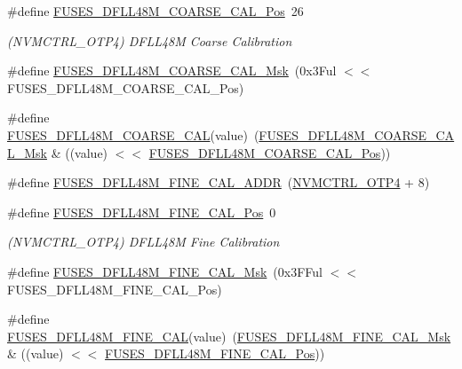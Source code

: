 \begin{DoxyCompactItemize}
\item 
\#define \mbox{\hyperlink{group__fuses__api_gae354249a65d7b4d818bbcc3594aa4991}{F\+U\+S\+E\+S\+\_\+\+D\+F\+L\+L48\+M\+\_\+\+C\+O\+A\+R\+S\+E\+\_\+\+C\+A\+L\+\_\+\+Pos}}~26
\begin{DoxyCompactList}\small\item\em (N\+V\+M\+C\+T\+R\+L\+\_\+\+O\+T\+P4) D\+F\+L\+L48M Coarse Calibration \end{DoxyCompactList}\item 
\#define \mbox{\hyperlink{group__fuses__api_ga0dc28e80d782bf23e5b6ad8d7fb5670e}{F\+U\+S\+E\+S\+\_\+\+D\+F\+L\+L48\+M\+\_\+\+C\+O\+A\+R\+S\+E\+\_\+\+C\+A\+L\+\_\+\+Msk}}~(0x3\+Ful $<$$<$ F\+U\+S\+E\+S\+\_\+\+D\+F\+L\+L48\+M\+\_\+\+C\+O\+A\+R\+S\+E\+\_\+\+C\+A\+L\+\_\+\+Pos)
\item 
\#define \mbox{\hyperlink{group__fuses__api_gad4952803016d6de9aaaa2dd5c8f28c5a}{F\+U\+S\+E\+S\+\_\+\+D\+F\+L\+L48\+M\+\_\+\+C\+O\+A\+R\+S\+E\+\_\+\+C\+AL}}(value)~(\mbox{\hyperlink{group__fuses__api_ga0dc28e80d782bf23e5b6ad8d7fb5670e}{F\+U\+S\+E\+S\+\_\+\+D\+F\+L\+L48\+M\+\_\+\+C\+O\+A\+R\+S\+E\+\_\+\+C\+A\+L\+\_\+\+Msk}} \& ((value) $<$$<$ \mbox{\hyperlink{group__fuses__api_gae354249a65d7b4d818bbcc3594aa4991}{F\+U\+S\+E\+S\+\_\+\+D\+F\+L\+L48\+M\+\_\+\+C\+O\+A\+R\+S\+E\+\_\+\+C\+A\+L\+\_\+\+Pos}}))
\item 
\#define \mbox{\hyperlink{group__fuses__api_gac9c0f651b70935ceb423075f1faa41fe}{F\+U\+S\+E\+S\+\_\+\+D\+F\+L\+L48\+M\+\_\+\+F\+I\+N\+E\+\_\+\+C\+A\+L\+\_\+\+A\+D\+DR}}~(\mbox{\hyperlink{group___s_a_m_d21_j18_a__base_ga138b4aca5a0446a745fe143c1dca8165}{N\+V\+M\+C\+T\+R\+L\+\_\+\+O\+T\+P4}} + 8)
\item 
\#define \mbox{\hyperlink{group__fuses__api_ga40e6a2aa26dfc93b0759bd39abeb1764}{F\+U\+S\+E\+S\+\_\+\+D\+F\+L\+L48\+M\+\_\+\+F\+I\+N\+E\+\_\+\+C\+A\+L\+\_\+\+Pos}}~0
\begin{DoxyCompactList}\small\item\em (N\+V\+M\+C\+T\+R\+L\+\_\+\+O\+T\+P4) D\+F\+L\+L48M Fine Calibration \end{DoxyCompactList}\item 
\#define \mbox{\hyperlink{group__fuses__api_gaf8a609bbffdf4350a5a5997f662f9d87}{F\+U\+S\+E\+S\+\_\+\+D\+F\+L\+L48\+M\+\_\+\+F\+I\+N\+E\+\_\+\+C\+A\+L\+\_\+\+Msk}}~(0x3\+F\+Ful $<$$<$ F\+U\+S\+E\+S\+\_\+\+D\+F\+L\+L48\+M\+\_\+\+F\+I\+N\+E\+\_\+\+C\+A\+L\+\_\+\+Pos)
\item 
\#define \mbox{\hyperlink{group__fuses__api_gad19e3e6eeb2c61330d6db3217512f7fb}{F\+U\+S\+E\+S\+\_\+\+D\+F\+L\+L48\+M\+\_\+\+F\+I\+N\+E\+\_\+\+C\+AL}}(value)~(\mbox{\hyperlink{group__fuses__api_gaf8a609bbffdf4350a5a5997f662f9d87}{F\+U\+S\+E\+S\+\_\+\+D\+F\+L\+L48\+M\+\_\+\+F\+I\+N\+E\+\_\+\+C\+A\+L\+\_\+\+Msk}} \& ((value) $<$$<$ \mbox{\hyperlink{group__fuses__api_ga40e6a2aa26dfc93b0759bd39abeb1764}{F\+U\+S\+E\+S\+\_\+\+D\+F\+L\+L48\+M\+\_\+\+F\+I\+N\+E\+\_\+\+C\+A\+L\+\_\+\+Pos}}))

\end{DoxyCompactItemize}
